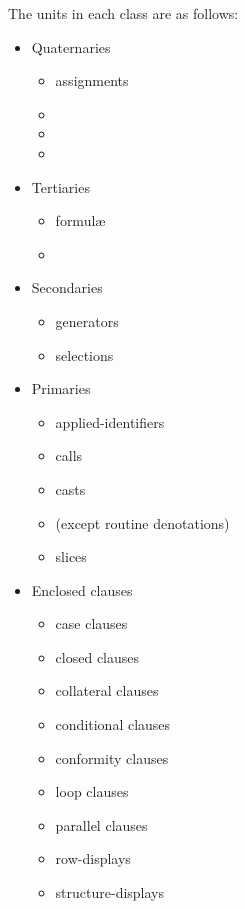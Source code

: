 The units in each class are as follows:
\begin{itemize}
\item Quaternaries
\begin{itemize}
\item assignments
\item {}
\item {}
\item {}
\end{itemize}
\item Tertiaries
\begin{itemize}
\item formul\ae{}
\item {}
\end{itemize}
\item Secondaries
\begin{itemize}
\item generators
\item selections
\end{itemize}
\item Primaries
\begin{itemize}
\item applied-identifiers
\item calls
\item casts
\item {} (except routine denotations)
\item slices
\end{itemize}
\item Enclosed clauses
\begin{itemize}
\item case clauses
\item closed clauses
\item collateral clauses
\item conditional clauses
\item conformity clauses
\item loop clauses
\item parallel clauses
\item row-displays
\item structure-displays
\end{itemize}
\end{itemize}

